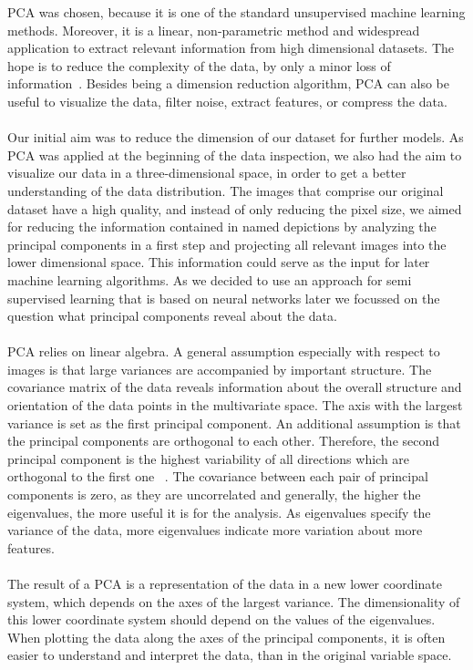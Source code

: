 PCA was chosen, because it is one of the standard unsupervised machine learning methods. Moreover, it is a linear, non-parametric method and widespread application to extract relevant information from high dimensional datasets. The hope is to reduce the complexity of the data, by only a minor loss of information~\citep{shlens2014}. Besides being a dimension reduction algorithm, PCA can also be useful to visualize the data, filter noise, extract features, or compress the data. \\
\\
Our initial aim was to reduce the dimension of our dataset for further models. As PCA was applied at the beginning of the data inspection, we also had the aim to visualize our data in a three-dimensional space, in order to get a better understanding of the data distribution. The images that comprise our original dataset have a high quality, and instead of only reducing the pixel size, we aimed for reducing the information contained in named depictions by analyzing the principal components in a first step and projecting all relevant images into the lower dimensional space. This information could serve as the input for later machine learning algorithms. As we decided to use an approach for semi supervised learning that is based on neural networks later we focussed on the question what principal components reveal about the data. \\
 \\
PCA relies on linear algebra. A general assumption especially with respect to images is that large variances are accompanied by important structure. The covariance matrix of the data reveals information about the overall structure and orientation of the data points in the multivariate space. The axis with the largest variance is set as the first principal component. An additional assumption is that the principal components are orthogonal to each other. Therefore, the second principal component is the highest variability of all directions which are orthogonal to the first one ~\citep{Bohling2006}. The covariance between each pair of principal components is zero, as they are uncorrelated and generally, the higher the eigenvalues, the more useful it is for the analysis. As eigenvalues specify the variance of the data, more eigenvalues indicate more variation about more features. \\
\\
The result of a PCA is a representation of the data in a new lower coordinate system, which depends on the axes of the largest variance. The dimensionality of this lower coordinate system should depend on the values of the eigenvalues. When plotting the data along the axes of the principal components, it is often easier to understand and interpret the data, than in the original variable space.  \\
